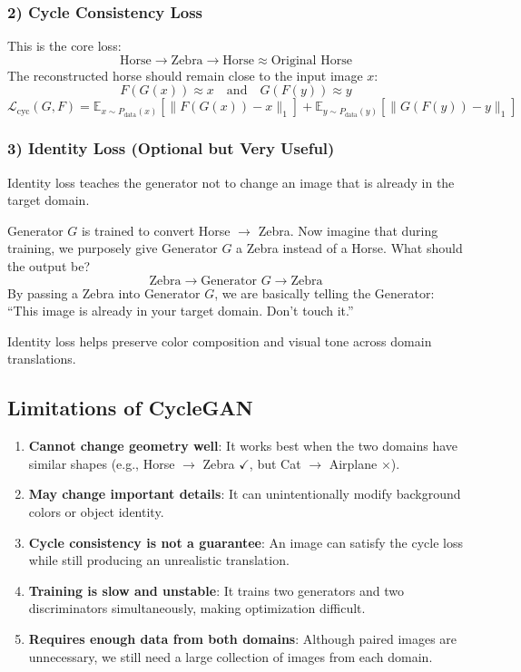 \subsubsection*{2) Cycle Consistency Loss}

This is the core loss:
\[
\text{Horse} \longrightarrow \text{Zebra} \longrightarrow \text{Horse} \approx \text{Original Horse}
\]
The reconstructed horse should remain close to the input image $x$:
\[
F(G(x)) \approx x \quad \text{and} \quad G(F(y)) \approx y
\]
\[
\mathcal{L}_{\text{cyc}}(G, F) = \mathbb{E}_{x \sim P_{\text{data}}(x)}[\|F(G(x)) - x\|_1] + \mathbb{E}_{y \sim P_{\text{data}}(y)}[\|G(F(y)) - y\|_1]
\]

\subsubsection*{3) Identity Loss (Optional but Very Useful)}

Identity loss teaches the generator not to change an image that is already in the target domain.

Generator $G$ is trained to convert Horse $\rightarrow$ Zebra. Now imagine that during training, we purposely give Generator $G$ a Zebra instead of a Horse. What should the output be?
\[
\text{Zebra} \longrightarrow \text{Generator } G \longrightarrow \text{Zebra}
\]
By passing a Zebra into Generator $G$, we are basically telling the Generator: ``This image is already in your target domain. Don't touch it.''

Identity loss helps preserve color composition and visual tone across domain translations.

\subsection*{Limitations of CycleGAN}
\begin{enumerate}
    \item \textbf{Cannot change geometry well}: It works best when the two domains have similar shapes (e.g., Horse $\rightarrow$ Zebra $\checkmark$, but Cat $\rightarrow$ Airplane $\times$).
    \item \textbf{May change important details}: It can unintentionally modify background colors or object identity.
    \item \textbf{Cycle consistency is not a guarantee}: An image can satisfy the cycle loss while still producing an unrealistic translation.
    \item \textbf{Training is slow and unstable}: It trains two generators and two discriminators simultaneously, making optimization difficult.
    \item \textbf{Requires enough data from both domains}: Although paired images are unnecessary, we still need a large collection of images from each domain.
\end{enumerate}

